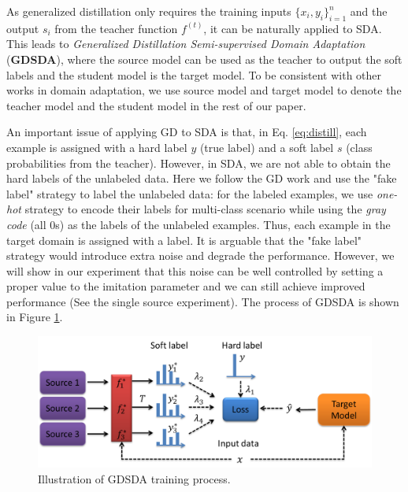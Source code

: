 As generalized distillation only requires the training inputs $\{x_i,y_i\}_{i=1}^n$ and the output $s_i$ from the teacher function $f^{(t)}$, it can be naturally applied to SDA. This leads to \textit{Generalized Distillation Semi-supervised Domain Adaptation} (\textbf{GDSDA}), where the source model can be used as the teacher to output the soft labels and the student model is the target model. To be consistent with other works in domain adaptation, we use source model and target model to denote the teacher model and the student model in the rest of our paper.

An important issue of applying GD to SDA is that, in Eq. \eqref{eq:distill}, each example is assigned with a hard label $y$ (true label) and a soft label $s$ (class probabilities from the teacher). However, in SDA, we are not able to obtain the hard labels of the unlabeled data. Here we follow the GD work\cite{lopez2015unifying} and use the "fake label" strategy to label the unlabeled data: for the labeled examples, we use \textit{one-hot} strategy to encode their labels for multi-class scenario while using the \textit{gray code} (all 0s) as the labels of the unlabeled examples. Thus, each example in the target domain is assigned with a label. It is arguable that the "fake label" strategy would introduce extra noise and degrade the performance. However, we will show in our experiment that this noise can be well controlled by setting a proper value to the imitation parameter and we can still achieve improved performance (See the single source experiment). The process of GDSDA is shown in Figure \ref{fig:GDSDA}.
\begin{figure}
	\centering
	\includegraphics[scale=.4]{figure/multi-GDDA.png}
	\caption{Illustration of GDSDA training process.}
	\label{fig:GDSDA}
\end{figure}
 

